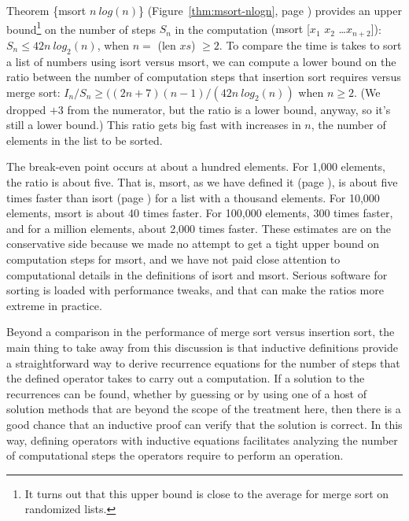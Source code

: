 Theorem \{msort $n~log(n)$\}
(Figure~\ref{thm:msort-nlogn}, page \pageref{thm:msort-nlogn}) provides
an upper bound\footnote{It
turns out that this upper bound is close to the average
for merge sort on randomized lists.}
on the number of steps $S_n$ in the computation
\textsf{(msort [$x_1$ $x_2$ \dots $x_{n+2}$])}:
$S_{n} \leq 42n~log_2(n)$, when $n =$ (len $xs$) $\geq 2$.
To compare the time is takes to sort a
list of numbers using \textsf{isort} versus \textsf{msort},
we can compute a lower bound on the ratio between
the number of computation steps that insertion sort requires
versus merge sort:
$I_n/S_n \geq ((2n+7)(n-1)/(42n~log_2(n))$ when $n \geq 2$.
(We dropped $+3$ from the numerator, but the ratio is a lower bound, anyway,
so it's still a lower bound.)
This ratio gets big fast with increases in $n$, the number of elements
in the list to be sorted.

The
break-even point occurs at about a hundred elements.
For 1,000 elements, the ratio is about five.
That is, \textsf{msort}, as we have defined it (page \pageref{defun:msort-copy}),
is about five times faster
than \textsf{isort} (page \pageref{defun:insert-isort})
for a list with a thousand elements.
For 10,000 elements, \textsf{msort} is about 40 times faster.
For 100,000 elements, 300 times faster,
and for a million elements, about 2,000 times faster.
These estimates are on the conservative side
because we made no attempt to get a tight
upper bound on computation steps for \textsf{msort},
and we have not paid close attention to computational details
in the definitions of \textsf{isort} and  \textsf{msort}.
Serious software for sorting is loaded with performance tweaks,
and that can make the ratios more extreme in practice.

Beyond a comparison in the performance of merge sort
versus insertion sort, the main thing to take away from this discussion
is that inductive definitions provide a straightforward way to
derive recurrence equations for the number of steps that the defined operator
takes to carry out a computation.
If a solution to the recurrences can be found,
whether by guessing or by using one of a host of solution methods
that are beyond the scope of the treatment here,
then there is a good chance that an
inductive proof
can verify that the solution is correct.
In this way, defining operators with inductive equations
facilitates analyzing the number of computational
steps the operators require to perform an operation.


